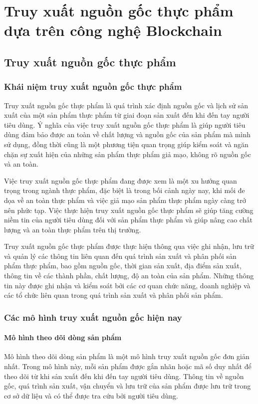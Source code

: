\chapter{ Truy xuất nguồn gốc thực phẩm dựa trên công nghệ Blockchain}

\section{Truy xuất nguồn gốc thực phẩm}
\label{Chapter2}
\subsection{Khái niệm truy xuất nguồn gốc thực phẩm}
Truy xuất nguồn gốc thực phẩm là quá trình xác định nguồn gốc và lịch sử sản xuất
của một sản phẩm thực phẩm từ giai đoạn sản xuất đến khi đến tay người tiêu dùng. Ý
nghĩa của việc truy xuất nguồn gốc thực phẩm là giúp người tiêu dùng đảm bảo được
an toàn về chất lượng và nguồn gốc của sản phẩm mà mình sử dụng, đồng thời cũng là
một phương tiện quan trọng giúp kiểm soát và ngăn chặn sự xuất hiện của những sản
phẩm thực phẩm giả mạo, không rõ nguồn gốc và an toàn.

Việc truy xuất nguồn gốc thực phẩm đang được xem là một xu hướng quan trọng
trong ngành thực phẩm, đặc biệt là trong bối cảnh ngày nay, khi mối đe dọa về an toàn
thực phẩm và việc giả mạo sản phẩm thực phẩm ngày càng trở nên phức tạp. Việc thực
hiện truy xuất nguồn gốc thực phẩm sẽ giúp tăng cường niềm tin của người tiêu dùng
đối với sản phẩm thực phẩm và giúp nâng cao chất lượng và an toàn thực phẩm trên thị
trường.

Truy xuất nguồn gốc thực phẩm được thực hiện thông qua việc ghi nhận, lưu trữ
và quản lý các thông tin liên quan đến quá trình sản xuất và phân phối sản phẩm thực
phẩm, bao gồm nguồn gốc, thời gian sản xuất, địa điểm sản xuất, thông tin về các thành
phần, chất lượng, độ an toàn của sản phẩm. Những thông tin này được ghi nhận và kiểm
soát bởi các cơ quan chức năng, doanh nghiệp và các tổ chức liên quan trong quá trình
sản xuất và phân phối sản phẩm.

\subsection{Các mô hình truy xuất nguồn gốc hiện nay}
\subsubsection{Mô hình theo dõi dòng sản phẩm }
Mô hình theo dõi dòng sản phẩm là một mô hình 
truy xuất nguồn gốc đơn giản nhất. Trong mô hình này, mỗi sản phẩm được gắn 
nhãn hoặc mã số duy nhất để theo dõi từ khi sản xuất đến khi đến tay người 
tiêu dùng. Thông tin về nguồn gốc, quá trình sản xuất, vận chuyển và lưu trữ 
của sản phẩm được lưu trữ trong cơ sở dữ liệu và có thể được tra cứu bởi người tiêu dùng.

